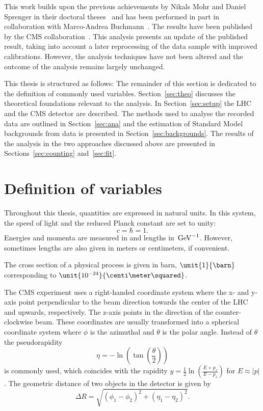This work builds upon the previous achievements by Nikals Mohr and Daniel Sprenger in their doctoral theses~\cite{Mohr:1423334,Sprenger:1501963} and has been performed in part in collaboration with Marco-Andrea Buchmann~\cite{Buchmann:1704399}. The results have been published by the CMS collaboration~\cite{Khachatryan:2015lwa}. This analysis presents an update of the published result, taking into account a later reprocessing of the data sample with improved calibrations. However, the analysis techniques have not been altered and the outcome of the analysis remains largely unchanged.

This thesis is structured as follows: The remainder of this section is dedicated to the definition of commonly used variables. Section~\ref{sec:theo} discusses the theoretical foundations relevant to the analysis. In Section~\ref{sec:setup} the LHC and the CMS detector are described. The methods used to analyse the recorded data are outlined in Section~\ref{sec:ana} and the estimation of Standard Model backgrounds from data is presented in Section~\ref{sec:backgrounds}. The results of the analysis in the two approaches discussed above are presented in Sections~\ref{sec:counting} and~\ref{sec:fit}. 

\section{Definition of variables}
\label{sec:variables}
Throughout this thesis, quantities are expressed in natural units. In this system, the speed of light and the reduced Planck constant are set to unity:
\begin{equation}
c = \hbar = 1.
\end{equation} 
Energies and momenta are measured in \GeV and lengths in $\text{\ensuremath{\,\mathrm{Ge\hspace{-.08em}V}}}^{-1}$. However, sometimes lengths are also given in meters or centimeters, if convenient. 

The cross section of a physical process is given in barn, $\unit{1}{\barn}$ corresponding to $\unit{10^{-24}}{\centi\meter\squared}$.   

The CMS experiment uses a right-handed coordinate system where the x- and y-axis point perpendicular to the beam direction towards the center of the LHC and upwards, respectively. The z-axis points in the direction of the counter-clockwise beam.  These coordinates are usually transformed into a spherical coordinate system where $\phi$ is the azimuthal and $\theta$ is the polar angle. Instead of $\theta$ the pseudorapidity 
\begin{equation}
\eta = -\ln \left( \tan\left(\frac{\theta}{2}\right)\right)
\end{equation}
is commonly used, which coincides with the rapidity $y = \frac{1}{2} \ln\left(\frac{E+p_z}{E-p_z}\right)$ for $E\approx |p|$. The geometric distance of two objects in the detector is given by
\begin{equation}
\Delta R = \sqrt{(\phi_1 - \phi_2)^2 + (\eta_1 - \eta_2)^2}.
\end{equation}

